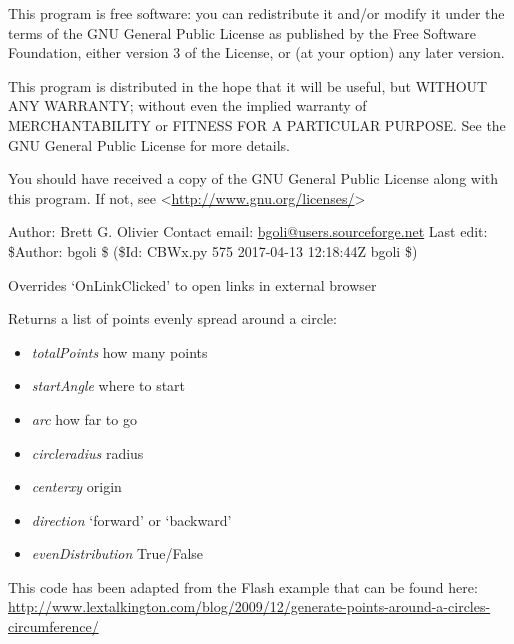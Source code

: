 \documentclass[a4paper,11pt,english]{sphinxmanual}
\begin{document}
This program is free software: you can redistribute it and/or modify
it under the terms of the GNU General Public License as published by
the Free Software Foundation, either version 3 of the License, or
(at your option) any later version.

This program is distributed in the hope that it will be useful,
but WITHOUT ANY WARRANTY; without even the implied warranty of
MERCHANTABILITY or FITNESS FOR A PARTICULAR PURPOSE.  See the
GNU General Public License for more details.

You should have received a copy of the GNU General Public License
along with this program.  If not, see \textless{}\url{http://www.gnu.org/licenses/}\textgreater{}

Author: Brett G. Olivier
Contact email: \href{mailto:bgoli@users.sourceforge.net}{bgoli@users.sourceforge.net}
Last edit: \$Author: bgoli \$ (\$Id: CBWx.py 575 2017-04-13 12:18:44Z bgoli \$)

\begin{fulllineitems}
\label{modules_doc:cbmpy.CBWx.HtmlWindowMod}
Overrides `OnLinkClicked' to open links in external browser

\end{fulllineitems}


\begin{fulllineitems}
\label{modules_doc:cbmpy.CBWx.circlePoints}
Returns a list of points evenly spread around a circle:
\begin{itemize}
\item {} 
\emph{totalPoints} how many points

\item {} 
\emph{startAngle} where to start

\item {} 
\emph{arc} how far to go

\item {} 
\emph{circleradius} radius

\item {} 
\emph{centerxy} origin

\item {} 
\emph{direction} `forward' or `backward'

\item {} 
\emph{evenDistribution} True/False

\end{itemize}

This code has been adapted from the Flash example that can be found here:
\url{http://www.lextalkington.com/blog/2009/12/generate-points-around-a-circles-circumference/}

\end{fulllineitems}
\end{document}

